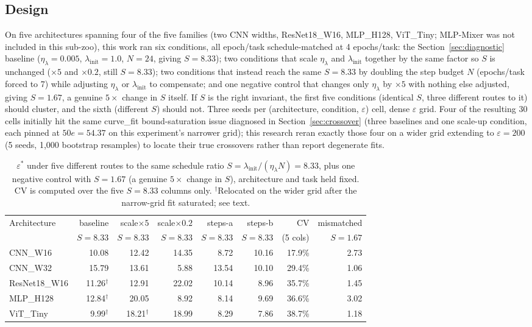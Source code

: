 \documentclass[11pt]{article}
\newcommand{\eps}{\varepsilon}
\newcommand{\epsstar}{\eps^{*}}
\begin{document}
\subsection{Design}
On five architectures spanning four of the five families (two CNN widths,
ResNet18\_W16, MLP\_H128, ViT\_Tiny; MLP-Mixer was not included in this
sub-zoo), this work ran six conditions, all epoch/task
schedule-matched at 4 epochs/task: the Section~\ref{sec:diagnostic} baseline
($\eta_\lambda=0.005$, $\lambda_{\mathrm{init}}=1.0$, $N=24$, giving
$S=8.33$); two conditions that scale $\eta_\lambda$ and
$\lambda_{\mathrm{init}}$ together by the same factor so $S$ is unchanged
($\times5$ and $\times0.2$, still $S=8.33$); two conditions that instead
reach the same $S=8.33$ by doubling the step budget $N$ (epochs/task forced
to 7) while adjusting $\eta_\lambda$ or $\lambda_{\mathrm{init}}$ to
compensate; and one negative control that changes only $\eta_\lambda$ by
$\times5$ with nothing else adjusted, giving $S=1.67$, a genuine $5\times$
change in $S$ itself. If $S$ is the right invariant, the first five
conditions (identical $S$, three different routes to it) should cluster,
and the sixth (different $S$) should not. Three seeds per (architecture,
condition, $\eps$) cell, dense $\eps$ grid. Four of the resulting 30 cells
initially hit the same curve\_fit bound-saturation issue diagnosed in
Section~\ref{sec:crossover} (three baselines and one scale-up condition,
each pinned at $50e=54.37$ on this experiment's narrower grid); this research reran
exactly those four on a wider grid extending to $\eps=200$ (5 seeds, 1{,}000
bootstrap resamples) to locate their true crossovers rather than report
degenerate fits.

\begin{table}[h]
\centering
\caption{$\epsstar$ under five different routes to the same schedule ratio
$S=\lambda_{\mathrm{init}}/(\eta_\lambda N)=8.33$, plus one negative control
with $S=1.67$ (a genuine $5\times$ change in $S$), architecture and task held
fixed. CV is computed over the five $S=8.33$ columns only.
$^\dagger$Relocated on the wider grid after the narrow-grid fit saturated;
see text.}
\label{tab:sinvariance}
\footnotesize
\begin{tabular}{lrrrrrrr}
\toprule
Architecture & baseline & scale$\times5$ & scale$\times0.2$ & steps-a & steps-b & CV & mismatched \\
& $S=8.33$ & $S=8.33$ & $S=8.33$ & $S=8.33$ & $S=8.33$ & (5 cols) & $S=1.67$ \\
\midrule
CNN\_W16      & 10.08 & 12.42 & 14.35 & 8.72  & 10.16 & 17.9\% & 2.73 \\
CNN\_W32      & 15.79 & 13.61 & 5.88  & 13.54 & 10.10 & 29.4\% & 1.06 \\
ResNet18\_W16 & 11.26$^\dagger$ & 12.91 & 22.02 & 10.14 & 8.96  & 35.7\% & 1.45 \\
MLP\_H128     & 12.84$^\dagger$ & 20.05 & 8.92  & 8.14  & 9.69  & 36.6\% & 3.02 \\
ViT\_Tiny     & 9.99$^\dagger$  & 18.21$^\dagger$ & 18.99 & 8.29  & 7.86  & 38.7\% & 1.18 \\
\bottomrule
\end{tabular}
\end{table}
\end{document}
